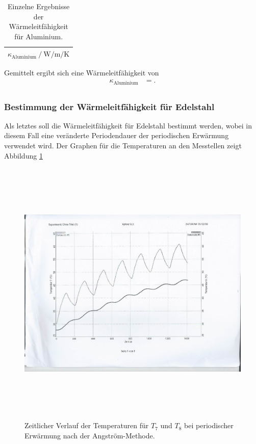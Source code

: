 \begin{table}
  \centering
  \caption{Einzelne Ergebnisse der Wärmeleitfähigkeit für Aluminium.}
  \label{tab:6}
  \begin{tabular}{c}
    \toprule
    {$\kappa_\text{Aluminium} \:/\: \si{\watt\per\metre\per\kelvin}$}\\
    \midrule
    
    \bottomrule
  \end{tabular}
\end{table}
Gemittelt ergibt sich eine Wärmeleitfähigkeit von
\begin{align*}
  \kappa_\text{Aluminium} &= . \\
\end{align*}

\subsubsection{Bestimmung der Wärmeleitfähigkeit für Edelstahl}
Als letztes soll die Wärmeleitfähigkeit für Edelstahl bestimmt werden, wobei in diesem Fall eine veränderte Periodendauer der periodischen Erwärmung verwendet wird.
Der Graphen für die Temperaturen an den Messtellen zeigt Abbildung \ref{fig:7}
\begin{figure}[H]
  \centering
  \includegraphics[height=13cm]{scan-1.jpg}
  \caption{Zeitlicher Verlauf der Temperaturen für $T_7$ und $T_8$ bei periodischer Erwärmung nach der Angström-Methode.}
  \label{fig:7}
\end{figure}
